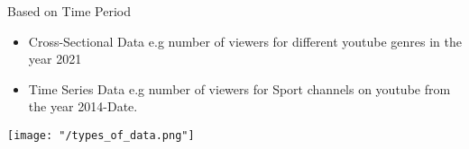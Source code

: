 \documentclass[
  ignorenonframetext,
]{beamer}
\providecommand{\tightlist}{%
  \setlength{\itemsep}{0pt}\setlength{\parskip}{0pt}}
\begin{document}
\begin{frame}{Based on Time Period}
\protect\hypertarget{based-on-time-period}{}
\begin{itemize}
\tightlist
\item
  Cross-Sectional Data e.g number of viewers for different youtube
  genres in the year 2021
\item
  Time Series Data e.g number of viewers for Sport channels on youtube
  from the year 2014-Date.
\end{itemize}
\end{frame}

\begin{frame}{}
\protect\hypertarget{section}{}
\texttt{[image: "/types\_of\_data.png"]}
\end{frame}
\end{document}
